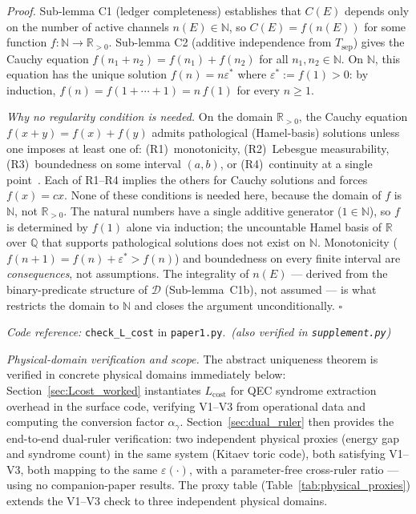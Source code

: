 \documentclass[11pt]{article}
\theoremstyle{remark}
\newcommand{\coderef}[2]{\smallskip\noindent\textit{Code reference:} \texttt{#1} in \texttt{#2}.}
\begin{document}
\begin{tcolorbox}[apfbox, title={$L_{\mathrm{cost}}$: Cost Functional Form Uniqueness}]
\smallskip\noindent\textit{Proof.}  Sub-lemma C1 (ledger completeness) establishes that $C(E)$ depends only on the number of active channels $n(E) \in \mathbb{N}$, so $C(E) = f(n(E))$ for some function $f: \mathbb{N} \to \mathbb{R}_{>0}$.  Sub-lemma C2 (additive independence from $T_{\mathrm{sep}}$) gives the Cauchy equation $f(n_1 + n_2) = f(n_1) + f(n_2)$ for all $n_1, n_2 \in \mathbb{N}$.  On $\mathbb{N}$, this equation has the unique solution $f(n) = n\varepsilon^*$ where $\varepsilon^* := f(1) > 0$: by induction, $f(n) = f(1 + \cdots + 1) = n\,f(1)$ for every $n \ge 1$.

\smallskip\noindent\textit{Why no regularity condition is needed.}  On the domain $\mathbb{R}_{>0}$, the Cauchy equation $f(x+y) = f(x) + f(y)$ admits pathological (Hamel-basis) solutions unless one imposes at least one of: (R1)~monotonicity, (R2)~Lebesgue measurability, (R3)~boundedness on some interval $(a,b)$, or (R4)~continuity at a single point~\cite{Aczel1966}.  Each of R1--R4 implies the others for Cauchy solutions and forces $f(x) = cx$.  None of these conditions is needed here, because the domain of $f$ is $\mathbb{N}$, not $\mathbb{R}_{>0}$.  The natural numbers have a single additive generator ($1 \in \mathbb{N}$), so $f$ is determined by $f(1)$ alone via induction; the uncountable Hamel basis of $\mathbb{R}$ over $\mathbb{Q}$ that supports pathological solutions does not exist on $\mathbb{N}$.  Monotonicity ($f(n+1) = f(n) + \varepsilon^* > f(n)$) and boundedness on every finite interval are \emph{consequences}, not assumptions.  The integrality of $n(E)$ --- derived from the binary-predicate structure of $\mathcal{D}$ (Sub-lemma~C1b), not assumed --- is what restricts the domain to $\mathbb{N}$ and closes the argument unconditionally.  \hfill$\square$

\coderef{check\_L\_cost}{paper1.py}\,%
\hspace{1em}\textit{(also verified in \texttt{supplement.py})}
\end{tcolorbox}

\smallskip\noindent\textit{Physical-domain verification and scope.}  The abstract uniqueness theorem is verified in concrete physical domains immediately below: Section~\ref{sec:Lcost_worked} instantiates $L_{\mathrm{cost}}$ for QEC syndrome extraction overhead in the surface code, verifying V1--V3 from operational data and computing the conversion factor $\alpha_\gamma$.  Section~\ref{sec:dual_ruler} then provides the end-to-end dual-ruler verification: two independent physical proxies (energy gap and syndrome count) in the same system (Kitaev toric code), both satisfying V1--V3, both mapping to the same $\varepsilon(\cdot)$, with a parameter-free cross-ruler ratio --- using no companion-paper results.  The proxy table (Table~\ref{tab:physical_proxies}) extends the V1--V3 check to three independent physical domains.
\end{document}
